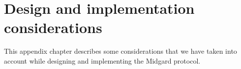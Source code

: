 \documentclass[../midgard.tex]{subfiles}
\begin{document}
\chapter{Design and implementation considerations}
\label{h:design-implementation-considerations}

This appendix chapter describes some considerations that we have taken into account while designing and implementing the Midgard protocol.
\end{document}
